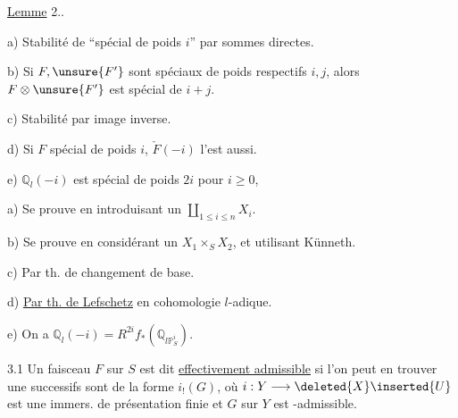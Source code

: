 

\uline{Lemme} 2..

a) Stabilité de ``spécial de poids $i$''  par sommes directes.

b) Si $F,\unsure{F'}$ sont spéciaux de poids respectifs $i,j$, alors $F\otimes \unsure{F'}$ est spécial de $i+j$.

c) Stabilité par image inverse.

d) Si $F$ spécial de poids $i$, $\check F(-i)$ l'est aussi.

e) $\mathbb Q_l(-i)$ est spécial de poids $2i$ pour $i\geq 0$,

a) Se prouve en introduisant un $\coprod_{1\leq i\leq n}X_i$.

b) Se prouve en considérant un $X_1\times_S X_2$, et utilisant Künneth.

c) Par th. de changement de base.

d) \uline{Par th. de Lefschetz} en cohomologie $l$-adique.


e) On  a $\mathbb Q_l(-i)=R^{2i}f_*(\mathbb Q_{l\mathbb P^i_S})$.


3.1 Un faisceau $F$ sur $S$ est dit \uline{effectivement admissible} si  l'on peut en trouver une   successifs sont de la forme $i_!(G)$, où $i:Y\longrightarrow \deleted{X}\inserted{U}$ est une immers. de présentation finie et $G$ sur  $Y$ est   -admissible.


